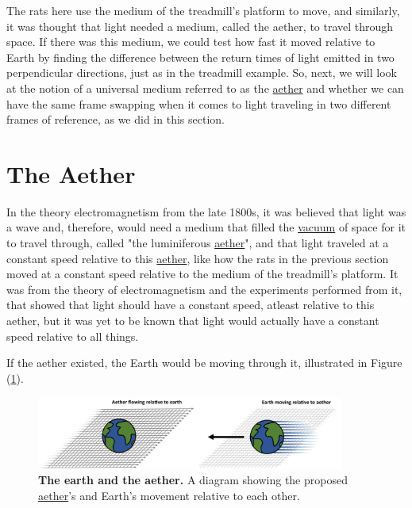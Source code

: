 The rats here use the medium of the treadmill's platform to move, and similarly, it was thought that light needed a medium, called the aether, to travel through space.
If there was this medium, we could test how fast it moved relative to Earth by finding the difference between the return times of light emitted in two perpendicular directions, just as in the treadmill example.
So, next, we will look at the notion of a universal medium referred to as the \hyperlink{def-aether}{aether} and whether we can have the same frame swapping when it comes to light traveling in two different frames of reference, as we did in this section.

\section{The Aether} \label{sect: The Aether}

In the theory electromagnetism from the late 1800s, it was believed that light was a wave and, therefore, would need a medium that filled the \hyperlink{def-vacuum}{vacuum} of space for it to travel through, called "the luminiferous \hyperlink{def-aether}{aether}", and that light traveled at a constant speed relative to this \hyperlink{def-aether}{aether}, like how the rats in the previous section moved at a constant speed relative to the medium of the treadmill's platform.
It was from the theory of electromagnetism and the experiments performed from it, that showed that light should have a constant speed, atleast relative to this aether, but it was yet to be known that light would actually have a constant speed relative to all things.

If the aether existed, the Earth would be moving through it, illustrated in Figure (\ref{fig: Aether}).

\begin{figure}[ht]
	\centering
	\includegraphics[width = 0.9\textwidth]{images/pdf/earth_and_aether.pdf}
	\caption{\textbf{The earth and the aether.} A diagram showing the proposed \protect\hyperlink{def-aether}{aether}'s and Earth's movement relative to each other.}
	\label{fig: Aether}
\end{figure}

